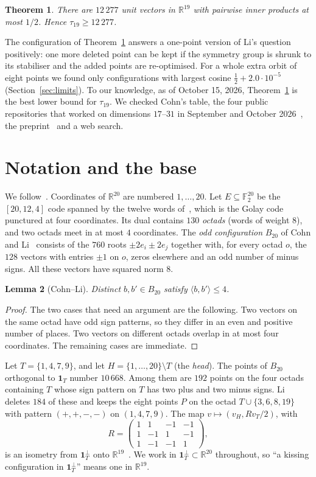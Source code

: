 \documentclass[11pt]{article}
\numberwithin{equation}{section}
\newtheorem{theorem}{Theorem}[section]
\newtheorem{lemma}[theorem]{Lemma}
\theoremstyle{definition}
\theoremstyle{remark}
\newcommand{\F}{\mathbb F}
\newcommand{\R}{\mathbb R}
\begin{document}
\begin{theorem}\label{thm:main}
There are $12\,277$ unit vectors in $\R^{19}$ with pairwise inner products at most $1/2$. Hence
$\tau_{19}\ge 12\,277$.
\end{theorem}

The configuration of Theorem~\ref{thm:main} answers a one-point version of Li's question positively:
one more deleted point can be kept if the symmetry group is shrunk to its stabiliser and the added
points are re-optimised. For a whole extra orbit of eight points we found only configurations with
largest cosine $\tfrac12+2.0\cdot10^{-5}$ (Section~\ref{sec:limits}). To our knowledge, as of
October 15, 2026, Theorem~\ref{thm:main} is the best lower bound for $\tau_{19}$. We checked
Cohn's table, the four public repositories that worked on dimensions $17$--$31$ in September and
October 2026~\cite{Li26,Li26b,Kra26,Long26}, the preprint~\cite{YZW26} and a web search.

\section{Notation and the base}\label{sec:base}
We follow~\cite{Li26b}. Coordinates of $\R^{20}$ are numbered $1,\dots,20$. Let $E\subseteq\F_2^{20}$
be the $[20,12,4]$ code spanned by the twelve words of~\cite[\S3.1]{Li26b}, which is the Golay code
punctured at four coordinates. Its dual contains $130$ \emph{octads} (words of weight $8$), and two
octads meet in at most $4$ coordinates. The \emph{odd configuration} $B_{20}$ of Cohn and
Li~\cite{CL24} consists of the $760$ roots $\pm2e_i\pm2e_j$ together with, for every octad $o$, the
$128$ vectors with entries $\pm1$ on $o$, zeros elsewhere and an odd number of minus signs. All
these vectors have squared norm $8$.

\begin{lemma}[Cohn--Li]\label{lem:CL}
Distinct $b,b'\in B_{20}$ satisfy $\langle b,b'\rangle\le4$.
\end{lemma}
\begin{proof}
The two cases that need an argument are the following. Two vectors on the same octad have odd sign
patterns, so they differ in an even and positive number of places. Two vectors on different octads
overlap in at most four coordinates. The remaining cases are immediate.
\end{proof}

Let $T=\{1,4,7,9\}$, and let $H=\{1,\dots,20\}\setminus T$ (the \emph{head}). The points of $B_{20}$
orthogonal to $\mathbf 1_T$ number $10\,668$. Among them are $192$ points on the four octads
containing $T$ whose sign pattern on $T$ has two plus and two minus signs. Li deletes $184$ of these
and keeps the eight points $P$ on the octad $T\cup\{3,6,8,19\}$ with pattern $(+,+,-,-)$ on $(1,4,7,9)$.
The map $v\mapsto(v_H, Rv_T/2)$, with
\[R=\begin{pmatrix}1&1&-1&-1\\1&-1&1&-1\\1&-1&-1&1\end{pmatrix},\]
is an isometry from $\mathbf 1_T^\perp$ onto $\R^{19}$~\cite[(2)]{Li26b}. We work in
$\mathbf 1_T^\perp\subset\R^{20}$ throughout, so ``a kissing configuration in $\mathbf 1_T^\perp$''
means one in $\R^{19}$.
\end{document}

